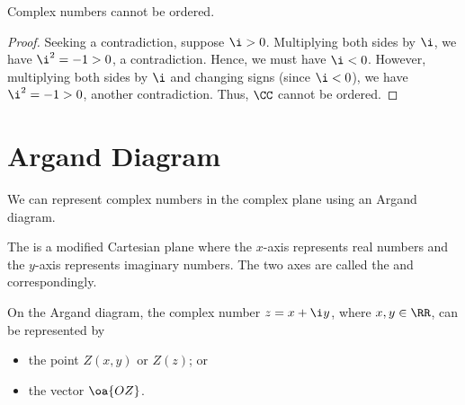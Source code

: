 \begin{proposition}
    Complex numbers cannot be ordered.
\end{proposition}
\begin{proof}
    Seeking a contradiction, suppose $\i > 0$. Multiplying both sides by $\i$, we have $\i^2 = -1 > 0$, a contradiction. Hence, we must have $\i < 0$. However, multiplying both sides by $\i$ and changing signs (since $\i < 0$), we have $\i^2 = -1 > 0$, another contradiction. Thus, $\CC$ cannot be ordered.
\end{proof}

\section{Argand Diagram}

We can represent complex numbers in the complex plane using an Argand diagram.

\begin{definition}
    The  is a modified Cartesian plane where the $x$-axis represents real numbers and the $y$-axis represents imaginary numbers. The two axes are called the  and  correspondingly.

    On the Argand diagram, the complex number $z = x + \i y$, where $x, y \in \RR$, can be represented by
    \begin{itemize}
        \item the point $Z(x, y)$ or $Z(z)$; or
        \item the vector $\oa{OZ}$.
    \end{itemize}

    \begin{figure}[H]
        \centering
        \caption{}
    \end{figure}
\end{definition}

